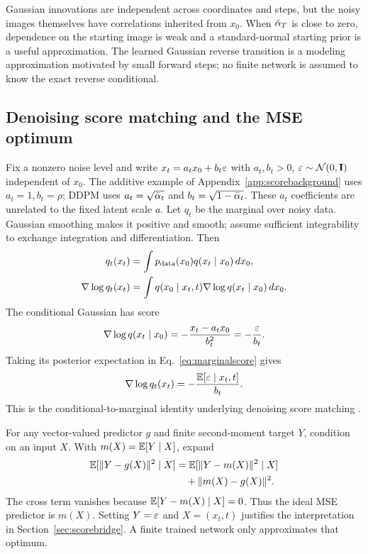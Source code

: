 Gaussian innovations are independent across coordinates and steps, but
the noisy images themselves have correlations inherited from $x_0$.
When $\bar{\alpha}_T$ is close to zero, dependence on the starting image is weak
and a standard-normal starting prior is a useful approximation.
The learned Gaussian reverse transition is a modeling approximation
motivated by small forward steps; no finite network is assumed to know
the exact reverse conditional.


\subsection{Denoising score matching and the MSE optimum}\label{app:dsm}
Fix a nonzero noise level and write $x_t=a_tx_0+b_t\varepsilon$ with
$a_t,b_t>0$, $\varepsilon\sim\mathcal{N}(0,\mathbf{I})$ independent of $x_0$.
The additive example of Appendix~\ref{app:scorebackground} uses $a_t=1,b_t=\rho$;
DDPM uses $a_t=\sqrt{\bar{\alpha}_t}$ and $b_t=\sqrt{1-\bar{\alpha}_t}$.
These $a_t$ coefficients are unrelated to the fixed latent scale $a$.
Let $q_t$ be the marginal over noisy data. Gaussian smoothing makes it
positive and smooth; assume sufficient integrability to exchange
integration and differentiation. Then
\begin{align}
q_t(x_t)&=\int p_{\rm data}(x_0)q(x_t\mid x_0)\,dx_0,\nonumber\\
\nabla\log q_t(x_t)
&=\int q(x_0\mid x_t,t)\nabla\log q(x_t\mid x_0)\,dx_0.
\label{eq:marginalscore}
\end{align}
The conditional Gaussian has score
\begin{equation}
\nabla\log q(x_t\mid x_0)
=-\frac{x_t-a_tx_0}{b_t^2}=-\frac{\varepsilon}{b_t}.
\end{equation}
Taking its posterior expectation in Eq.~\eqref{eq:marginalscore} gives
\begin{equation}
\nabla\log q_t(x_t)=-\frac{\mathbb{E}[\varepsilon\mid x_t,t]}{b_t}.
\label{eq:ddpmscore}
\end{equation}
This is the conditional-to-marginal identity underlying denoising score
matching \cite{vincent2011dsm,song2019score}.

For any vector-valued predictor $g$ and finite second-moment target $Y$,
condition on an input $X$. With $m(X)=\mathbb{E}[Y\mid X]$, expand
\begin{equation}
\begin{aligned}
\mathbb{E}[\|Y-g(X)\|^2\mid X]
&=\mathbb{E}[\|Y-m(X)\|^2\mid X]\\
&\quad+\|m(X)-g(X)\|^2.
\end{aligned}
\end{equation}
The cross term vanishes because $\mathbb{E}[Y-m(X)\mid X]=0$.
Thus the ideal MSE predictor is $m(X)$. Setting $Y=\varepsilon$ and $X=(x_t,t)$
justifies the interpretation in Section~\ref{sec:scorebridge}.
A finite trained network only approximates that optimum.

